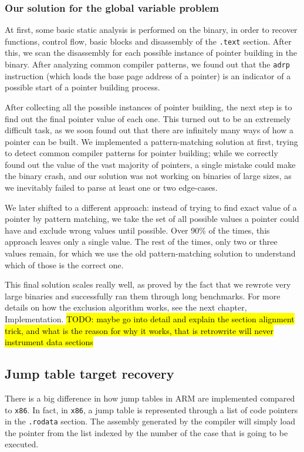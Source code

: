 \documentclass[a4paper,11pt,oneside]{report}
\newcommand{\todo}[1]{%
	\begingroup 
	\sethlcolor{cyan}%
	\hl{TODO: #1}%
	\endgroup
}
\begin{document}
\subsubsection{Our solution for the global variable problem}

At first, some basic static analysis is performed on the binary, in order to 
recover functions, control flow, basic blocks and disassembly of the 
\texttt{.text} section. After this, we scan the disassembly for each possible 
instance of pointer building in the binary. After analyzing common compiler 
patterns, we found out that the \texttt{adrp} instruction (which loads the base 
page address of a pointer) is an indicator of a possible start of a pointer 
building process. 

After collecting all the possible instances of pointer building, the next step 
is to find out the final pointer value of each one. This turned out to be an 
extremely difficult task, as we soon found out that there are infinitely many 
ways of how a pointer can be built. We implemented a pattern-matching solution 
at first, trying to detect common compiler patterns for pointer building; while 
we correctly found out the value of the vast majority of pointers, a single 
mistake could make the binary crash, and our solution was not working on 
binaries of large sizes, as we inevitably failed to parse at least one or two 
edge-cases.

We later shifted to a different approach: instead of trying to find exact value 
of a pointer by pattern matching, we take the set of all possible values a 
pointer could have and exclude wrong values until possible. Over 90\% of the 
times, this approach leaves only a single value. The rest of the times, only 
two or three values remain, for which we use the old pattern-matching solution 
to understand which of those is the correct one. 

This final solution scales really well, as proved by the fact that we rewrote 
very large binaries and successfully ran them through long benchmarks. For more 
details on how the exclusion algorithm works, see the next chapter, 
Implementation.  \todo{maybe go into detail and explain the section alignment 
trick, and what is the reason for why it works, that is retrowrite will never 
instrument data sections}


\subsection{Jump table target recovery}
There is a big difference in how jump tables in ARM are implemented compared to 
\texttt{x86}. In fact, in \texttt{x86}, a jump table is represented through a 
list of code pointers in the \texttt{.rodata} section. The assembly generated 
by the compiler will simply load the pointer from the list indexed by the 
number of the case that is going to be executed. 
\end{document}
